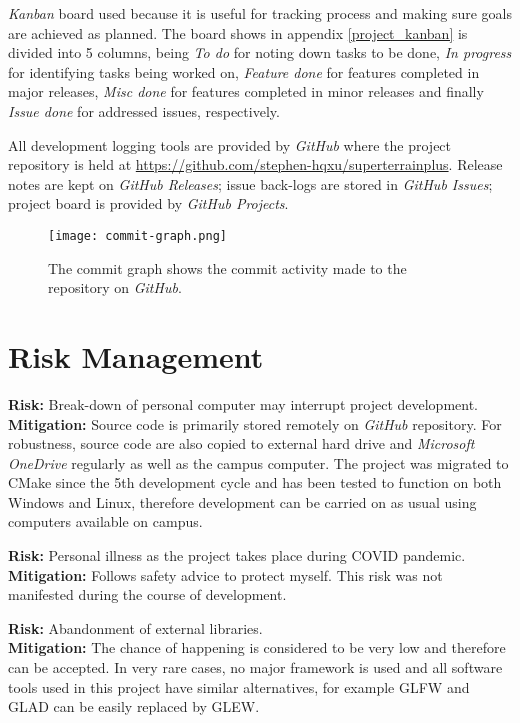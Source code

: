 \documentclass[oneside, a4paper]{report}
\begin{document}
    \textit{Kanban} board used because it is useful for tracking process and making sure goals are achieved as planned. The board shows in appendix \ref{project_kanban} is divided into 5 columns, being \textit{To do} for noting down tasks to be done, \textit{In progress} for identifying tasks being worked on, \textit{Feature done} for features completed in major releases, \textit{Misc done} for features completed in minor releases and finally \textit{Issue done} for addressed issues, respectively.

    All development logging tools are provided by \textit{GitHub} where the project repository is held at \url{https://github.com/stephen-hqxu/superterrainplus}. Release notes are kept on \textit{GitHub Releases}; issue back-logs are stored in \textit{GitHub Issues}; project board is provided by \textit{GitHub Projects}.

    \begin{figure}[H]
        \texttt{[image: commit-graph.png]}
        \caption{The commit graph shows the commit activity made to the repository on \textit{GitHub}.}
    \end{figure}

    \section{Risk Management}

    \textbf{Risk:} Break-down of personal computer may interrupt project development. \\
    \textbf{Mitigation:} Source code is primarily stored remotely on \textit{GitHub} repository. For robustness, source code are also copied to external hard drive and \textit{Microsoft OneDrive} regularly as well as the campus computer. The project was migrated to CMake since the 5th development cycle and has been tested to function on both Windows and Linux, therefore development can be carried on as usual using computers available on campus.

    \textbf{Risk:} Personal illness as the project takes place during COVID pandemic. \\
    \textbf{Mitigation:} Follows safety advice to protect myself. This risk was not manifested during the course of development.

    \textbf{Risk:} Abandonment of external libraries. \\
    \textbf{Mitigation:} The chance of happening is considered to be very low and therefore can be accepted. In very rare cases, no major framework is used and all software tools used in this project have similar alternatives, for example GLFW and GLAD can be easily replaced by GLEW.
\end{document}
